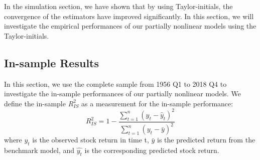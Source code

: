 \documentclass[a4paper,12pt,times,numbered,print,index]{report}
\numberwithin{equation}{section}
\begin{document}
In the simulation section, we have shown that by using Taylor-initials, the convergence of the estimators have improved significantly. In this section, we will investigate the empirical performances of our partially nonlinear models using the Taylor-initials.








\subsection{In-sample Results}
In this section, we use the complete sample from 1956 Q1 to 2018 Q4 to investigate the in-sample performances of our partially nonlinear models. We define the in-sample $R^2_{IS}$ as a measurement for the in-sample performance:
\begin{equation}
	R_{IS}^{2}=1-\frac{\sum_{t=1}^{n}\left(y_{t}-\widehat{y}_{t}\right)^{2}}{\sum_{t=1}^{n}\left(y_{t}-\bar{y}\right)^{2}}
\end{equation}
where $y_t$ is the observed stock return in time t, $\bar{y}$ is the predicted return from the benchmark model, and $\hat{y_{t}}$ is the corresponding predicted stock return. 
\end{document}
